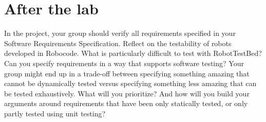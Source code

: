 \documentclass{scrreprt}
\begin{document}
\chapter{After the lab}
In the project, your group should verify all requirements specified in your Software Requirements Specification. Reflect on the testability of robots developed in Robocode. What is particularly difficult to test with RobotTestBed? Can you specify requirements in a way that supports software testing? Your group might end up in a trade-off between specifying something amazing that cannot be dynamically  tested versus specifying something less amazing that can be tested exhaustively. What will you prioritize? And how will you build your arguments around requirements that have been only statically tested, or only partly tested using unit testing?
\end{document}

